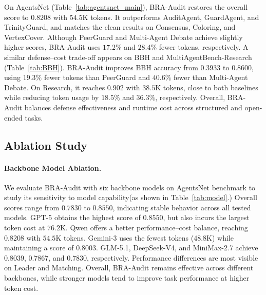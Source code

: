 \documentclass[letterpaper]{article} %
\begin{document}
On AgentsNet (Table~\ref{tab:agentsnet_main}), BRA-Audit restores the
overall score to \(0.8208\) with \(54.5\)K tokens. It outperforms
AuditAgent, GuardAgent, and TrinityGuard, and matches the clean results
on Consensus, Coloring, and VertexCover. Although PeerGuard and
Multi-Agent Debate achieve slightly higher scores, BRA-Audit uses
\(17.2\%\) and \(28.4\%\) fewer tokens, respectively.
A similar defense--cost trade-off appears on BBH and
MultiAgentBench-Research (Table~\ref{tab:BBH}). BRA-Audit improves BBH
accuracy from \(0.3933\) to \(0.8600\), using \(19.3\%\) fewer tokens
than PeerGuard and \(40.6\%\) fewer than Multi-Agent Debate. On
Research, it reaches \(0.902\) with \(38.5\)K tokens, close to both
baselines while reducing token usage by \(18.5\%\) and \(36.3\%\),
respectively. Overall, BRA-Audit balances defense effectiveness and
runtime cost across structured and open-ended tasks.



\subsection{Ablation Study}


\paragraph{Backbone Model Ablation.}
We evaluate BRA-Audit with six backbone models on AgentsNet benchmark to study its sensitivity to model capability(as shown in Table~\ref{tab:model}.) Overall scores range from \(0.7830\) to \(0.8550\), indicating stable behavior across all tested models. GPT-5 obtains the highest score of \(0.8550\), but also incurs the largest token cost at \(76.2\)K. Qwen offers a better performance--cost balance, reaching \(0.8208\) with \(54.5\)K tokens. Gemini-3 uses the fewest tokens (\(48.8\)K) while maintaining a score of \(0.8003\). GLM-5.1, DeepSeek-V4, and MiniMax-2.7 achieve \(0.8039\), \(0.7867\), and \(0.7830\), respectively. Performance differences are most visible on Leader and Matching. Overall, BRA-Audit remains effective across different backbones, while stronger models tend to improve task performance at higher token cost.



\end{document}
